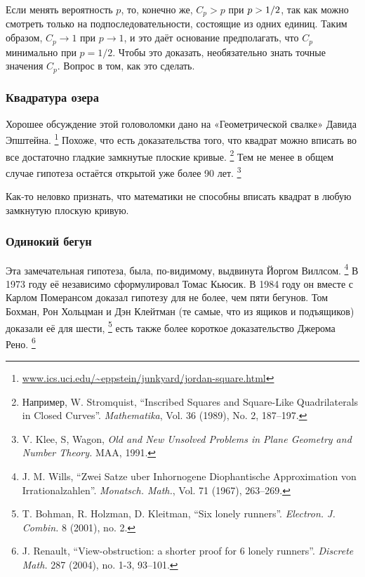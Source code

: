 Если менять вероятность $p$, то, конечно же, $C_p>p$ при $p \z> 1/2$, так как можно смотреть только на подпоследовательности, состоящие из одних единиц.
Таким образом, $C_p\to 1$ при $p\to 1$, и это даёт основание предполагать, что $C_p$ минимально при $p=1/2$.
Чтобы это доказать, необязательно знать точные значения $C_p$.
Вопрос в том, как это сделать.

\subsubsection*{Квадратура озера}

Хорошее обсуждение этой головоломки дано на «Геометрической свалке» Давида Эпштейна.%
\footnote{\href{http://www.ics.uci.edu/~eppstein/junkyard/jordan-square.html}{\url{www.ics.uci.edu/~eppstein/junkyard/jordan-square.html}}}
Похоже, что есть доказательства того, что квадрат можно вписать во все достаточно гладкие замкнутые плоские кривые.%
\footnote{Например, W. Stromquist, ``Inscribed Squares and Square-Like Quadrilaterals in Closed Curves''. \emph{Mathematika}, Vol. 36 (1989), No. 2, 187--197.}
Тем не менее в общем случае гипотеза остаётся открытой уже более 90 лет.%
\footnote{V. Klee, S, Wagon, \emph{Old and New Unsolved Problems in Plane Geometry and Number Theory.} MAA, 1991.}

\medskip

Как-то неловко признать, что математики не способны вписать квадрат в любую замкнутую плоскую кривую.

\subsubsection*{Одинокий бегун}

{

\sloppy

Эта замечательная гипотеза, была, по-видимому, выдвинута Йоргом Виллсом.%
\footnote{J. M. Wills, ``Zwei Satze uber Inhornogene Diophantische Approximation von Irrationalzahlen''. \emph{Monatsch. Math.}, Vol. 71 (1967), 263--269.}
В 1973 году её независимо сформулировал Томас Кьюсик.
В 1984 году он вместе с Карлом Померансом доказал гипотезу для не более, чем пяти бегунов.
Том Бохман, Рон Хольцман и Дэн Клейтман (те самые, что из ящиков и подъящиков) доказали её для шести,%
\footnote{T. Bohman, R. Holzman, D. Kleitman,
``Six lonely runners''.
\emph{Electron. J. Combin.} 8 (2001), no. 2.
}
есть также более короткое доказательство Джерома Рено.%
\footnote{J. Renault, ``View-obstruction: a shorter proof for 6 lonely runners''. \emph{Discrete Math.} 287 (2004), no. 1-3, 93--101.}

}

